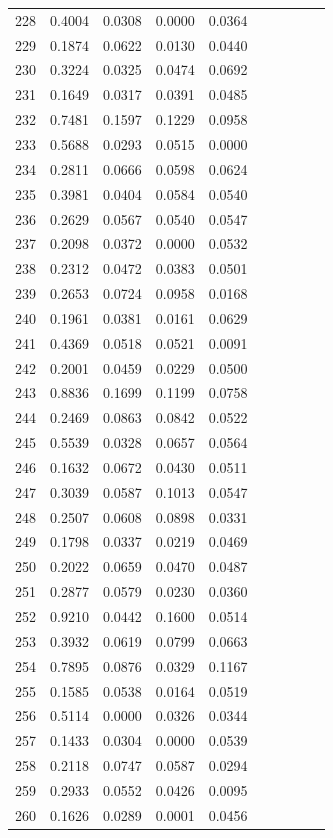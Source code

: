 \begin{table}
\begin{tabular}{cccccccccc}
228& 0.4004& 0.0308& 0.0000& 0.0364\\ 
229& 0.1874& 0.0622& 0.0130& 0.0440\\ 
230& 0.3224& 0.0325& 0.0474& 0.0692\\ 
231& 0.1649& 0.0317& 0.0391& 0.0485\\ 
232& 0.7481& 0.1597& 0.1229& 0.0958\\ 
233& 0.5688& 0.0293& 0.0515& 0.0000\\ 
234& 0.2811& 0.0666& 0.0598& 0.0624\\ 
235& 0.3981& 0.0404& 0.0584& 0.0540\\ 
236& 0.2629& 0.0567& 0.0540& 0.0547\\ 
237& 0.2098& 0.0372& 0.0000& 0.0532\\ 
238& 0.2312& 0.0472& 0.0383& 0.0501\\ 
239& 0.2653& 0.0724& 0.0958& 0.0168\\ 
240& 0.1961& 0.0381& 0.0161& 0.0629\\ 
241& 0.4369& 0.0518& 0.0521& 0.0091\\ 
242& 0.2001& 0.0459& 0.0229& 0.0500\\ 
243& 0.8836& 0.1699& 0.1199& 0.0758\\ 
244& 0.2469& 0.0863& 0.0842& 0.0522\\ 
245& 0.5539& 0.0328& 0.0657& 0.0564\\ 
246& 0.1632& 0.0672& 0.0430& 0.0511\\ 
247& 0.3039& 0.0587& 0.1013& 0.0547\\ 
248& 0.2507& 0.0608& 0.0898& 0.0331\\ 
249& 0.1798& 0.0337& 0.0219& 0.0469\\ 
250& 0.2022& 0.0659& 0.0470& 0.0487\\ 
251& 0.2877& 0.0579& 0.0230& 0.0360\\ 
252& 0.9210& 0.0442& 0.1600& 0.0514\\ 
253& 0.3932& 0.0619& 0.0799& 0.0663\\ 
254& 0.7895& 0.0876& 0.0329& 0.1167\\ 
255& 0.1585& 0.0538& 0.0164& 0.0519\\ 
256& 0.5114& 0.0000& 0.0326& 0.0344\\ 
257& 0.1433& 0.0304& 0.0000& 0.0539\\ 
258& 0.2118& 0.0747& 0.0587& 0.0294\\ 
259& 0.2933& 0.0552& 0.0426& 0.0095\\ 
260& 0.1626& 0.0289& 0.0001& 0.0456\\ 

\end{tabular}
\end{table}
